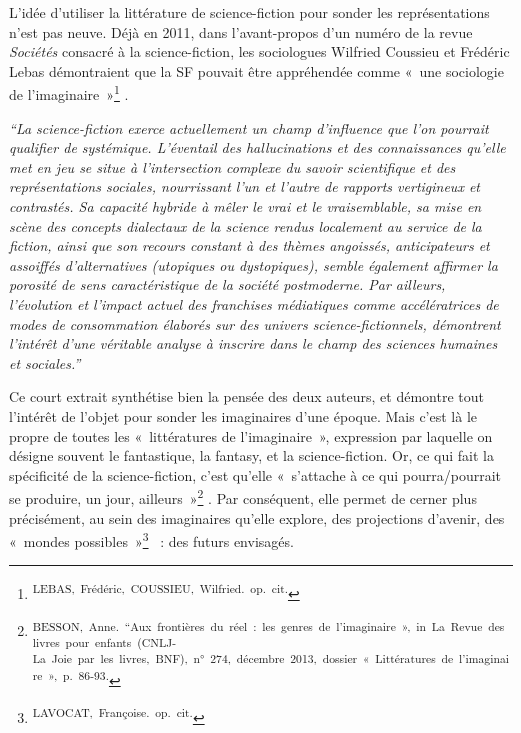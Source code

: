 \documentclass[letterpaper,portrait,12pt]{article}
\begin{document}
	L'id\'{e}e d'utiliser la litt\'{e}rature de science-fiction pour sonder les repr\'{e}sentations n'est pas neuve. D\'{e}j\`{a} en 2011, dans l'avant-propos d'un num\'{e}ro de la revue \emph{Soci\'{e}t\'{e}s} consacr\'{e} \`{a} la science-fiction, les sociologues Wilfried Coussieu et Fr\'{e}d\'{e}ric Lebas d\'{e}montraient que la SF pouvait \^{e}tre appr\'{e}hend\'{e}e comme « une sociologie de l'imaginaire »\footnote{\textsuperscript{\newpage
}\textsuperscript{	LEBAS,\ Fr\'{e}d\'{e}ric,\ COUSSIEU,\ Wilfried.\ op.\ cit.}} .





	\emph{{``}La science-fiction exerce actuellement un champ d'influence que l'on pourrait qualifier de syst\'{e}mique. L'\'{e}ventail des hallucinations et des connaissances qu'elle met en jeu se situe \`{a} l'intersection complexe du savoir scientifique et des repr\'{e}sentations sociales, nourrissant l'un et l'autre de rapports vertigineux et contrast\'{e}s. Sa capacit\'{e} hybride \`{a} m\^{e}ler le vrai et le vraisemblable, sa mise en sc\`{e}ne des concepts dialectaux de la science rendus localement au service de la fiction, ainsi que son recours constant \`{a} des th\`{e}mes angoiss\'{e}s, anticipateurs et assoiff\'{e}s d'alternatives (utopiques ou dystopiques), semble \'{e}galement affirmer la porosit\'{e} de sens caract\'{e}ristique de la soci\'{e}t\'{e} postmoderne. Par ailleurs, l'\'{e}volution et l'impact actuel des franchises m\'{e}diatiques comme acc\'{e}l\'{e}ratrices de modes de consommation \'{e}labor\'{e}s sur des univers science-fictionnels, d\'{e}montrent l'int\'{e}r\^{e}t d'une v\'{e}ritable analyse \`{a} inscrire dans le champ des sciences humaines et sociales.'' }





	Ce court extrait synth\'{e}tise bien la pens\'{e}e des deux auteurs, et d\'{e}montre tout l'int\'{e}r\^{e}t de l'objet pour sonder les imaginaires d'une \'{e}poque. Mais c'est l\`{a} le propre de toutes les « litt\'{e}ratures de l'imaginaire », expression par laquelle on d\'{e}signe souvent le fantastique, la fantasy, et la science-fiction. Or, ce qui fait la sp\'{e}cificit\'{e} de la science-fiction, c'est qu'elle « s'attache \`{a} ce qui pourra/pourrait se produire, un jour, ailleurs »\footnote{\textsuperscript{\newpage
}\textsuperscript{	BESSON,\ Anne.\ {``}Aux\ fronti\`{e}res\ du\ r\'{e}el\ :\ les\ genres\ de\ l'imaginaire\ »,\ in\ La\ Revue\ des\ livres\ pour\ enfants\ (CNLJ-La\ Joie\ par\ les\ livres,\ BNF),\ n°\ 274,\ d\'{e}cembre\ 2013,\ dossier\ «\ Litt\'{e}ratures\ de\ l'imaginaire\ »,\ p.\ 86-93.}} . Par cons\'{e}quent, elle permet de cerner plus pr\'{e}cis\'{e}ment, au sein des imaginaires qu'elle explore, des projections d'avenir, des « mondes possibles »\footnote{\textsuperscript{\newpage
}\textsuperscript{	LAVOCAT,\ Fran\c{c}oise.\ op.\ cit.}}  : des futurs envisag\'{e}s.
\end{document}
